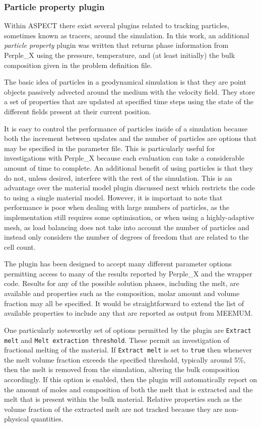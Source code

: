 \subsubsection{Particle property plugin}

Within ASPECT there exist several plugins related to tracking particles, sometimes known as tracers, around the simulation.
In this work, an additional \textit{particle property} plugin was written that returns phase information from Perple\_X using the pressure, temperature, and (at least initially) the bulk composition given in the problem definition file.

The basic idea of particles in a geodynamical simulation is that they are point objects passively advected around the medium with the velocity field.
They store a set of properties that are updated at specified time steps using the state of the different fields present at their current position.

It is easy to control the performance of particles inside of a simulation because both the increment between updates and the number of particles are options that may be specified in the parameter file.
This is particularly useful for investigations with Perple\_X because each evaluation can take a considerable amount of time to complete.
An additional benefit of using particles is that they do not, unless desired, interfere with the rest of the simulation.
This is an advantage over the material model plugin discussed next which restricts the code to using a single material model.
However, it is important to note that performance is poor when dealing with large numbers of particles, as the implementation still requires some optimisation, or when using a highly-adaptive mesh, as load balancing does not take into account the number of particles and instead only considers the number of degrees of freedom that are related to the cell count.

The plugin has been designed to accept many different parameter options permitting access to many of the results reported by Perple\_X and the wrapper code.
Results for any of the possible solution phases, including the melt, are available and properties such as the composition, molar amount and volume fraction may all be specified.
It would be straightforward to extend the list of available properties to include any that are reported as output from MEEMUM.

One particularly noteworthy set of options permitted by the plugin are \texttt{Extract melt} and \texttt{Melt extraction threshold}.
These permit an investigation of fractional melting of the material.
If \texttt{Extract melt} is set to \texttt{true} then whenever the melt volume fraction exceeds the specified \mbox{threshold}, typically around 5\%, then the melt is removed from the simulation, altering the bulk composition accordingly.
If this option is enabled, then the plugin will automatically report on the amount of moles and composition of both the melt that is extracted and the melt that is present within the bulk material.
Relative properties such as the volume fraction of the extracted melt are not tracked because they are non-physical quantities.

